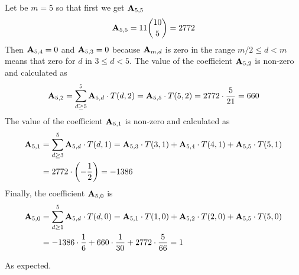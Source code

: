\begin{examp}
    Let be $m=5$ so that first we get ${\mathbf{A}} \sb{5,5}$
    \begin{equation*}
        {\mathbf{A}} \sb{5,5} = 11 \binom{10}{5}= 2772
    \end{equation*}
    Then ${\mathbf{A}} \sb{5,4} = 0$ and ${\mathbf{A}} \sb{5,3} = 0$
    because ${\mathbf{A}} \sb{m,d}$ is zero in the range $m/2 \leq d < m$ means that zero for $d$ in $3 \leq d < 5$.
    The value of the coefficient ${\mathbf{A}} \sb{5,2}$ is non-zero and calculated as
    \begin{equation*}
        \begin{split}
            {\mathbf{A}} \sb{5,2}
            = \sum_{d \geq 5}^{5} {\mathbf{A}} \sb{5,d} \cdot T(d,2) = {\mathbf{A}} \sb{5,5} \cdot T(5,2) = 2772 \cdot \frac{5}{21} = 660
        \end{split}
    \end{equation*}
    The value of the coefficient ${\mathbf{A}} \sb{5,1}$ is non-zero and calculated as
    \begin{equation*}
        \begin{split}
            {\mathbf{A}} \sb{5,1}
            &= \sum_{d \geq 3}^{5} {\mathbf{A}} \sb{5,d} \cdot T(d,1)
            = {\mathbf{A}} \sb{5,3} \cdot T(3,1) + {\mathbf{A}} \sb{5,4} \cdot T(4,1) + {\mathbf{A}} \sb{5,5} \cdot T(5,1) \\
            &= 2772 \cdot \left( - \frac{1}{2} \right) = -1386
        \end{split}
    \end{equation*}
    Finally, the coefficient ${\mathbf{A}} \sb{5,0}$ is
    \begin{equation*}
        \begin{split}
            {\mathbf{A}} \sb{5,0}
            &= \sum_{d \geq 1}^{5} {\mathbf{A}} \sb{5,d} \cdot T(d, 0)
            = {\mathbf{A}} \sb{5,1} \cdot T(1, 0) + {\mathbf{A}} \sb{5,2} \cdot T(2, 0) + {\mathbf{A}} \sb{5,5} \cdot T(5, 0) \\
            &= -1386 \cdot \frac{1}{6} + 660 \cdot \frac{1}{30} + 2772 \cdot \frac{5}{66} = 1
        \end{split}
    \end{equation*}
\end{examp}
As expected.
